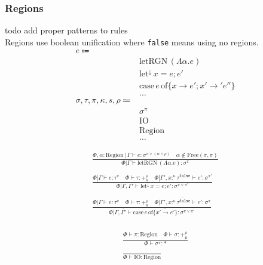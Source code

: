 \documentclass {article}
\begin{document}
\subsubsection{Regions}
todo add proper patterns to rules \\
Regions use boolean unification where \texttt{false} means using no regions.
\begin{align*}
e \Coloneqq & \\
& \text{letRGN} \, (\Lambda \alpha. e) \tag{Bind Region Type Variable (Unused)} \\
& \text{let}^\downarrow \, x = e; e' \tag{Runtime Let} \\
& \text{case} \, e \, \text{of} \{ x \to e'; x' \to' e''\} \tag{Case} \\
& \dots \\
\sigma, \tau, \pi, \kappa, s, \rho \Coloneqq & \\
& \sigma^\pi \tag{Region Effect} \\
& \text{IO} \tag{IO Region} \\
& \text{Region} \tag{Region} \\
& \dots
\end{align*}

\begin{gather*}
\frac
{\Phi , \alpha : \text{Region} \, | \, \Gamma \vdash e : \sigma^{\pi \lor (\alpha \land \rho)} \quad \alpha \notin \text{Free}(\sigma, \pi)}
{\Phi | \Gamma \vdash \text{letRGN} \, (\Lambda \alpha. e) : \sigma^\pi} \\
\\
\frac
{\Phi | \Gamma \vdash e : \tau^\pi \quad \Phi \vdash \tau : +^{\rho}_{\kappa} \quad \Phi | \Gamma', x :^{\kappa} \tau^\texttt{false} \vdash e' : \sigma^{\pi'}}
{\Phi | \Gamma, \Gamma' \vdash \text{let}^\downarrow \, x = e; e' : \sigma^{\pi \lor \pi'}} \\
\\
\frac
{\Phi | \Gamma \vdash e : \tau^\pi \quad \Phi \vdash \tau : +^{\rho}_{\kappa} \quad \overline{ \Phi | \Gamma', x :^{\kappa} \tau^\texttt{false} \vdash e' : \sigma^\pi }}
{\Phi | \Gamma, \overline {\Gamma'} \vdash \text{case} \, e \, \text{of} \{ \overline {x' \to  e' } \} : \sigma^{\pi \lor \overline{\pi'}}} \\
\end{gather*}

\begin{gather*}
\frac
{\Phi \vdash \pi : \text{Region} \quad \Phi \vdash \sigma : +^\rho_\mu}
{\Phi \vdash \sigma^\pi : *} \\
\\
\frac
{}
{\Phi \vdash \text{IO} : \text{Region}}
\end{gather*}
\end{document}
